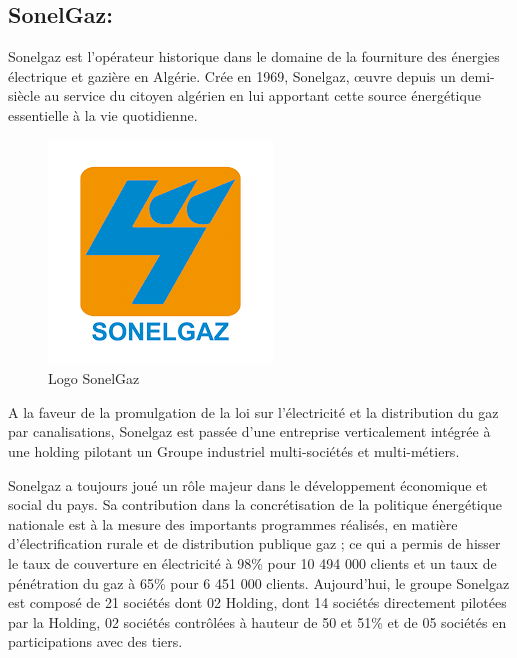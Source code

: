 \subsection{SonelGaz:}

Sonelgaz est l'opérateur historique dans le domaine de la fourniture des énergies électrique et gazière en Algérie. Crée en 1969, Sonelgaz, œuvre depuis un demi-siècle au service du citoyen algérien en lui apportant cette source énergétique essentielle à la vie quotidienne.

\begin{figure}[h]
	\centering
    \includegraphics[scale=1]{img/part2/1.6}
    \caption{Logo SonelGaz}
\end{figure}

A la faveur de la promulgation de la loi sur l'électricité et la distribution du gaz par canalisations, Sonelgaz est passée d'une entreprise verticalement intégrée à une holding pilotant un Groupe industriel multi-sociétés et multi-métiers.

Sonelgaz a toujours joué un rôle majeur dans le développement économique et social du pays. Sa contribution dans la concrétisation de la politique énergétique nationale est à la mesure des importants programmes réalisés, en matière d'électrification rurale et de distribution publique gaz ; ce qui a permis de hisser le taux de couverture en électricité à 98\% pour 10 494 000 clients et un taux de pénétration du gaz à 65\% pour 6 451 000 clients. Aujourd’hui, le groupe Sonelgaz est composé de 21 sociétés dont 02 Holding, dont 14 sociétés directement pilotées par la Holding, 02 sociétés contrôlées à hauteur de 50 et 51\% et de 05 sociétés en participations avec des tiers.